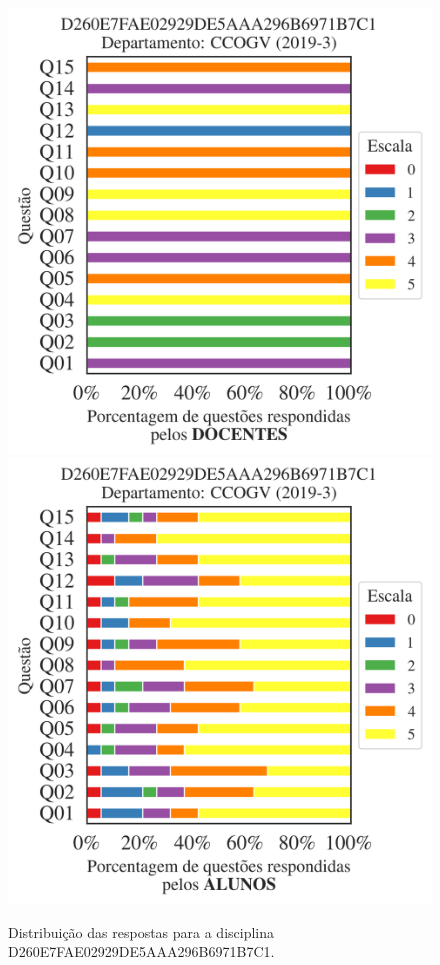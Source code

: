 \documentclass[a4paper,10pt]{article}
\begin{document}
\begin{figure}[h]
\centering
\includegraphics[width=0.485\linewidth]{analise_disciplina_departamento_CCOGV_D260E7FAE02929DE5AAA296B6971B7C1_docentes.png}
\includegraphics[width=0.485\linewidth]{analise_disciplina_departamento_CCOGV_D260E7FAE02929DE5AAA296B6971B7C1_alunos.png}
\caption{\label{fig:analise_geral_departamento}                Distribuição das respostas para a disciplina D260E7FAE02929DE5AAA296B6971B7C1. }
\end{figure}
\end{document}
